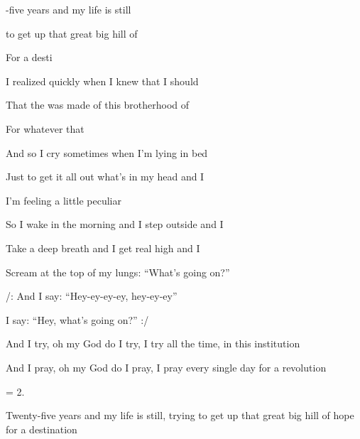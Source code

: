 
\zs
{}-five years and my life is still

 to get up that great big hill of 

For a desti

I realized quickly when I knew that I should

That the  was made of this brotherhood of 

For whatever that 
\ks

\zs
And so I cry sometimes when I'm lying in bed

Just to get it all out what's in my head and I

I'm feeling a little peculiar

So I wake in the morning and I step outside and I

Take a deep breath and I get real high and I

Scream at the top of my lungs: ``What's going on?''
\ks

\zr
/: And I say: ``Hey-ey-ey-ey, hey-ey-ey''

I say: ``Hey, what's going on?'' :/
\kr

   

\zs
And I try, oh my God do I try, I try all the time, in this institution

And I pray, oh my God do I pray, I pray every single day for a revolution
\ks

\zs                      
= 2.
\ks

\zr
\kr

\zs
Twenty-five years and my life is still, trying to get up that great big hill 
of hope for a destination
\ks

\kp

